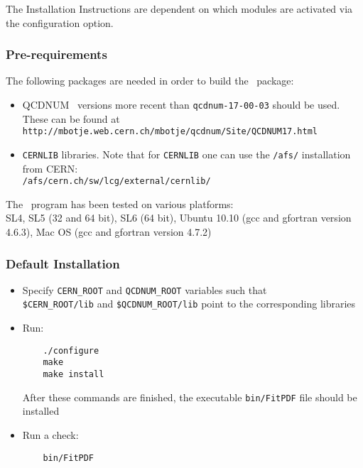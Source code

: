 
\label{sec:install}

The Installation Instructions are dependent on which modules are activated via the configuration option. 
\subsubsection{Pre-requirements}

The following packages are needed in order to build the \fitter\ package:
\begin{itemize}
\item QCDNUM~\cite{qcdnum} versions more recent than {\tt qcdnum-17-00-03} should be used. These can be found at \\
  {\tt http://mbotje.web.cern.ch/mbotje/qcdnum/Site/QCDNUM17.html}
\item {\tt CERNLIB} libraries. Note that for {\tt CERNLIB} one can use the {\tt /afs/} installation from CERN:\\
  {\tt /afs/cern.ch/sw/lcg/external/cernlib/}
\end{itemize}
The \fitter\ program has been tested on various platforms:\\
SL4, SL5 (32 and 64 bit), SL6 (64 bit),  Ubuntu 10.10 (gcc and gfortran version 4.6.3), Mac OS (gcc and gfortran version 4.7.2) 

\subsubsection{Default Installation}
\begin{itemize}
\item
 Specify {\tt CERN\_ROOT} 
     and {\tt QCDNUM\_ROOT} variables such that\\
     \verb'$CERN_ROOT/lib'  and \verb'$QCDNUM_ROOT/lib'
 point to the corresponding libraries
\item Run:
\begin{verbatim}
    ./configure
    make 
    make install
\end{verbatim}
After these commands are finished, the executable {\tt bin/FitPDF} 
file should be installed
\item  Run a check:
\begin{verbatim}
    bin/FitPDF 
\end{verbatim}
\end{itemize}

